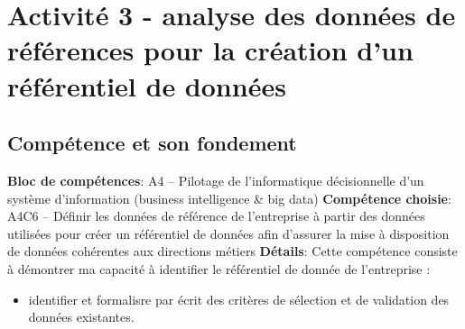 \documentclass[a4paper, 11pt]{report}
\begin{document}
\section{Activité 3 - analyse des données de références pour la création d'un référentiel de données}
\subsection{Compétence et son fondement}
\textbf{Bloc de compétences}: A4 – Pilotage de l’informatique décisionnelle d’un système d’information (business intelligence & big data)
\newline
\textbf{Compétence choisie}: A4C6 – Définir les données de référence de l’entreprise à partir des données utilisées pour créer un référentiel de données afin d’assurer la mise à disposition de données cohérentes aux directions métiers
\newline
\textbf{Détails}: Cette compétence consiste à démontrer ma capacité à identifier le référentiel de donnée de l’entreprise :
\begin{itemize}
  \item identifier et formalisre par écrit des critères de sélection et de validation des données existantes.
\end{itemize}
\end{document}
